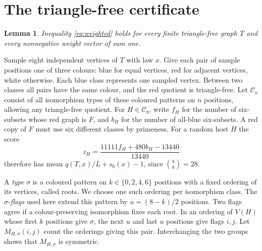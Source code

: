 \documentclass[11pt,a4paper]{article}
\newtheorem{lemma}[theorem]{Lemma}
\begin{document}
\section{The triangle-free certificate}\label{sec:colour}

\begin{lemma}\label{lem:tf}
Inequality \eqref{eq:weighted} holds for every finite triangle-free graph \(T\) and every nonnegative weight vector of sum one.
\end{lemma}

Sample eight independent vertices of \(T\) with law \(x\). Give each pair of sample positions one of three colours: blue for equal vertices, red for adjacent vertices, white otherwise. Each blue class represents one sampled vertex. Between two classes all pairs have the same colour, and the red quotient is triangle-free. Let \(\mathcal C_n\) consist of all isomorphism types of these coloured patterns on \(n\) positions, allowing any triangle-free quotient. For \(H\in\mathcal C_8\), write \(f_H\) for the number of six-subsets whose red graph is \(F\), and \(b_H\) for the number of all-blue six-subsets. A red copy of \(F\) must use six different classes by primeness. For a random host \(H\) the score
\begin{equation}\label{eq:z}
 z_H=\frac{11111 f_H+480 b_H-13440}{13440}
\end{equation}
therefore has mean \(q(T,x)/L+s_6(x)-1\), since \(\binom86=28\).

A \emph{type} \(\sigma\) is a coloured pattern on \(k\in\{0,2,4,6\}\) positions with a fixed ordering of its vertices, called roots. We choose one such ordering per isomorphism class. The \(\sigma\)-\emph{flags} used here extend this pattern by \(u=(8-k)/2\) positions. Two flags agree if a colour-preserving isomorphism fixes each root. In an ordering of \(V(H)\) whose first \(k\) positions give \(\sigma\), the next \(u\) and last \(u\) positions give flags \(i,j\). Let \(M_{H,\sigma}(i,j)\) count the orderings giving this pair. Interchanging the two groups shows that \(M_{H,\sigma}\) is symmetric.
\end{document}
